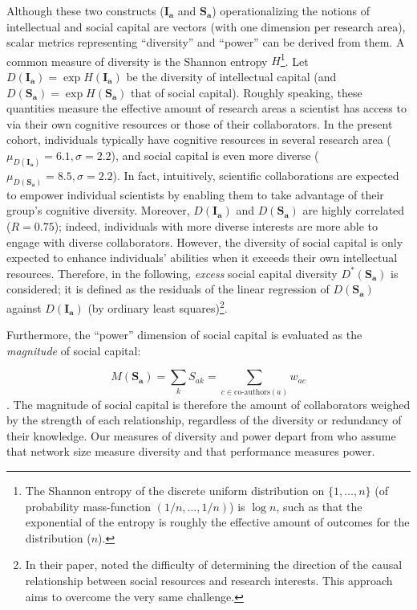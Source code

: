 \documentclass{article}
\begin{document}
Although these two constructs ($\bm{I_a}$ and $\bm{S_a}$) operationalizing the notions of intellectual and social capital are vectors (with one dimension per research area), scalar metrics representing ``diversity'' and ``power'' can be derived from them. A common measure of diversity is the Shannon entropy $H$\footnote{The Shannon entropy of the discrete uniform distribution on $\{1,\dots,n\}$ (of probability mass-function $(1/n,\dots,1/n)$) is $\log{n}$, such as that the exponential of the entropy is roughly the effective amount of outcomes for the distribution ($n$).}. Let 
 $D(\bm{I_a})=\exp{H(\bm{I_a})}$ be the diversity of intellectual capital (and $D(\bm{S_a})=\exp{H(\bm{S_a})}$ that of social capital). Roughly speaking, these quantities measure the effective amount of research areas a scientist has access to via their own cognitive resources or those of their collaborators. In the present cohort,  individuals typically have cognitive resources in several research area ($\mu_{D(\bm{I_a})}=6.1,\sigma=2.2$), and social capital is even more diverse ($\mu_{D(\bm{S_a})}=8.5,\sigma=2.2$). In fact, intuitively,  scientific collaborations are expected to empower individual scientists by enabling them to take advantage of their group's cognitive diversity. Moreover, $D(\bm{I_a})$ and $D(\bm{S_a})$ are highly correlated ($R=0.75$); indeed, individuals with more diverse interests are more able to engage with diverse collaborators. However, the diversity of social capital is only expected to enhance individuals' abilities when it exceeds their own intellectual resources. Therefore, in the following, \textit{excess} social capital diversity $D^{\ast}(\bm{S_a})$ is considered; it is defined as the residuals of the linear regression of $D(\bm{S_a})$ against $D(\bm{I_a})$ (by ordinary least squares)\footnote{In their paper, \citet{Tripodi2020} noted the difficulty of determining the direction of the causal relationship between social resources and research interests. This approach aims to overcome the very same challenge.}.

Furthermore, the ``power'' dimension of social capital is evaluated as the \textit{magnitude} of social capital:

\begin{equation}
    M(\bm{S_a})=\sum_k S_{ak} = \sum_{c \in \text{co-authors}(a)} w_{ac}
\end{equation}. The magnitude of social capital is therefore the amount of collaborators weighed by the strength of each relationship, regardless of the diversity or redundancy of their knowledge. Our measures of diversity and power depart from \citet{Abbasi2014} who assume that network size measure diversity and that performance measures power. %
\end{document}
